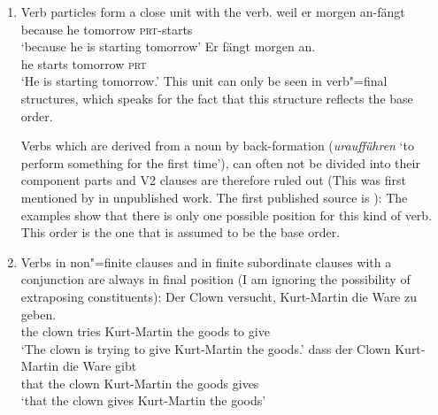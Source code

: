 \begin{enumerate}
\item Verb particles form a close unit with the verb.
\eal
\ex 
\gll weil er morgen an-fängt\\
     because he tomorrow \textsc{prt}-starts\\
\glt `because he is starting tomorrow'
\ex 
\gll Er fängt morgen an.\\
	 he starts tomorrow \textsc{prt}\\
\glt `He is starting tomorrow.'
\zl
This unit can only be seen in verb"=final structures, which speaks for the fact that this structure reflects the base order.

Verbs which are derived from a noun by back-formation (\eg \emph{uraufführen} 
`to perform something for the first time'), can often not be divided into their component parts and
V2 clauses are therefore ruled out (This was first mentioned by \citet{Hoehle91b} in unpublished
work. The first published source is ):
\eal
{}
\zl
The examples show that there is only one possible position for this kind of verb. This order is the one that is assumed to be the base order.
\item Verbs in non"=finite clauses and in finite subordinate clauses with a conjunction are
always in final position (I am ignoring the possibility of extraposing constituents):
\eal
\ex 
\gll Der Clown versucht, Kurt-Martin die Ware zu geben.\\
     the clown tries Kurt-Martin the goods to give\\
\glt `The clown is trying to give Kurt-Martin the goods.'
\ex 
\gll dass der Clown Kurt-Martin die Ware gibt\\
	 that the clown Kurt-Martin the goods gives\\
\glt `that the clown gives Kurt-Martin the goods'
\zl


\end{enumerate}
